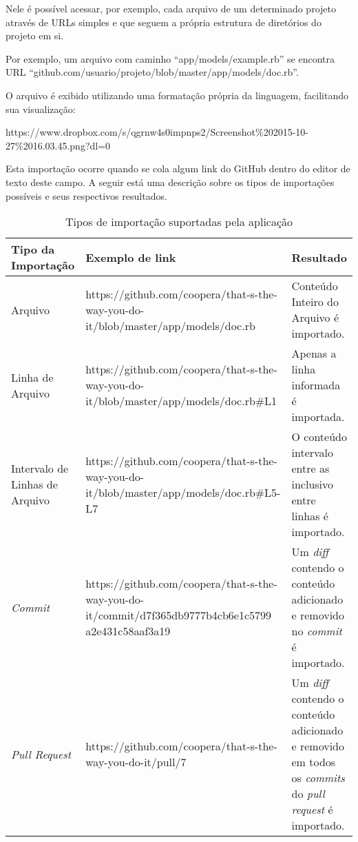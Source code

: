 Nele é possível acessar, por exemplo, cada arquivo de um determinado projeto através de URLs simples e que seguem a própria estrutura de diretórios do projeto em si.

Por exemplo, um arquivo com caminho ``app/models/example.rb'' se encontra URL ``github.com/usuario/projeto/blob/master/app/models/doc.rb''.

O arquivo é exibido utilizando uma formatação própria da linguagem, facilitando sua visualização:

https://www.dropbox.com/s/qgrnw4s0impnps2/Screenshot\%202015-10-27\%2016.03.45.png?dl=0


Esta importação ocorre quando se cola algum link do GitHub dentro do editor de texto deste campo. A seguir está uma descrição sobre os tipos de importações possíveis e seus respectivos resultados.

\begin{table}[]
\begin{center}
    \caption{Tipos de importação suportadas pela aplicação}
    \label{my-label}
    \begin{tabular}{| p{3cm} | p{7cm} | p{5cm} |}
    \hline
    Tipo da Importação & Exemplo de link & Resultado \\ \hline
    Arquivo & https://github.com/coopera/that-s-the-way-you-do-it/blob/master/app/models/doc.rb & Conteúdo Inteiro do Arquivo é importado. \\ \hline
    Linha de Arquivo & https://github.com/coopera/that-s-the-way-you-do-it/blob/master/app/models/doc.rb\#L1 & Apenas a linha informada é importada. \\ \hline
    Intervalo de Linhas de Arquivo & https://github.com/coopera/that-s-the-way-you-do-it/blob/master/app/models/doc.rb\#L5-L7 & O conteúdo intervalo entre as inclusivo entre linhas é importado. \\ \hline
    \textit{Commit} & https://github.com/coopera/that-s-the-way-you-do-it/commit/d7f365db9777b4cb6e1c5799 a2e431c58aaf3a19 & Um \textit{diff} contendo o conteúdo adicionado e removido no \textit{commit} é importado. \\ \hline
    \textit{Pull Request} & https://github.com/coopera/that-s-the-way-you-do-it/pull/7 & Um \textit{diff} contendo o conteúdo adicionado e removido em todos os \textit{commits} do \textit{pull request} é importado.  \\ \hline
    \end{tabular}
\end{center}
\end{table}

